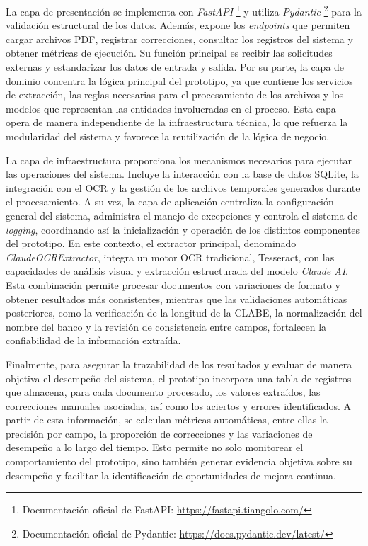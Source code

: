 La capa de presentación se implementa con \textit{FastAPI} \footnote{Documentación oficial de FastAPI: \url{https://fastapi.tiangolo.com/}} y utiliza \textit{Pydantic} \footnote{Documentación oficial de Pydantic: \url{https://docs.pydantic.dev/latest/}} para la validación estructural de los datos. Además, expone los \textit{endpoints} que permiten cargar archivos PDF, registrar correcciones, consultar los registros del sistema y obtener métricas de ejecución. Su función principal es recibir las solicitudes externas y estandarizar los datos de entrada y salida. Por su parte, la capa de dominio concentra la lógica principal del prototipo, ya que contiene los servicios de extracción, las reglas necesarias para el procesamiento de los archivos y los modelos que representan las entidades involucradas en el proceso. Esta capa opera de manera independiente de la infraestructura técnica, lo que refuerza la modularidad del sistema y favorece la reutilización de la lógica de negocio.

La capa de infraestructura proporciona los mecanismos necesarios para ejecutar las operaciones del sistema. Incluye la interacción con la base de datos SQLite, la integración con el OCR y la gestión de los archivos temporales generados durante el procesamiento. A su vez, la capa de aplicación centraliza la configuración general del sistema, administra el manejo de excepciones y controla el sistema de \textit{logging}, coordinando así la inicialización y operación de los distintos componentes del prototipo. En este contexto, el extractor principal, denominado \textit{ClaudeOCRExtractor}, integra un motor OCR tradicional, Tesseract, con las capacidades de análisis visual y extracción estructurada del modelo \textit{Claude AI}. Esta combinación permite procesar documentos con variaciones de formato y obtener resultados más consistentes, mientras que las validaciones automáticas posteriores, como la verificación de la longitud de la CLABE, la normalización del nombre del banco y la revisión de consistencia entre campos, fortalecen la confiabilidad de la información extraída.

Finalmente, para asegurar la trazabilidad de los resultados y evaluar de manera objetiva el desempeño del sistema, el prototipo incorpora una tabla de registros que almacena, para cada documento procesado, los valores extraídos, las correcciones manuales asociadas, así como los aciertos y errores identificados. A partir de esta información, se calculan métricas automáticas, entre ellas la precisión por campo, la proporción de correcciones y las variaciones de desempeño a lo largo del tiempo. Esto permite no solo monitorear el comportamiento del prototipo, sino también generar evidencia objetiva sobre su desempeño y facilitar la identificación de oportunidades de mejora continua.

